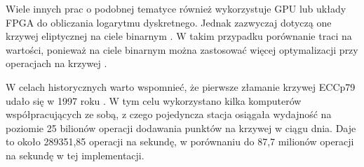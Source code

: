 Wiele innych prac o podobnej tematyce również wykorzystuje GPU lub układy FPGA do
obliczania logarytmu dyskretnego. Jednak zazwyczaj dotyczą one krzywej
eliptycznej na ciele binarnym \cite{Wenger2014,FPGA2008,Majkowski2008}. W
takim przypadku porównanie traci na wartości, ponieważ na ciele binarnym
można zastosować więcej optymalizacji przy operacjach na krzywej \cite{Blake2005}.

W celach historycznych warto wspomnieć, że pierwsze złamanie krzywej ECCp79
udało się w 1997 roku \cite{certicom-cracked}. W tym celu wykorzystano kilka komputerów
współpracujących ze sobą, z czego pojedyncza stacja osiągała wydajność na
poziomie 25 bilionów operacji dodawania punktów na krzywej w ciągu dnia. Daje to około 289351,85 operacji na
sekundę, w porównaniu do 87,7 milionów operacji na sekundę w tej
implementacji.